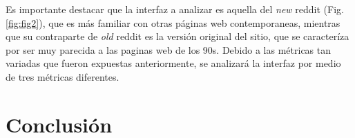 Es importante destacar que la interfaz a analizar es aquella del \emph{new} reddit (Fig. \ref{fig:fig2}), que es
más familiar con otras páginas web contemporaneas, mientras que su contraparte de \emph{old}
reddit es la versión original del sitio, que se caracteríza por ser muy parecida a las paginas
web de los 90s. Debido a las métricas tan variadas que fueron expuestas anteriormente, se analizará
la interfaz por medio de tres métricas diferentes.
\\

\section{Conclusión}


